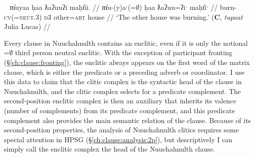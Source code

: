 \ex~ \label{ex:2padjpart}
\begingl
\glpreamble m̓uyaa ḥaa ƛaʔuuʔi maḥt̓ii. //
\gla m̓u-(y)aˑ(=$\emptyset$) ḥaa ƛaʔuu=ʔiˑ maḥt̓iˑ  //
\glb burn-\textsc{cv}(=\textsc{neut.3}) \textsc{d3} other=\textsc{art} house //
\glft `The other house was burning.' (\textbf{C}, \textit{tupaat} Julia Lucas) //
\endgl
\xe


Every clause in Nuuchahnulth contains an enclitic, even if it is only the notional =$\emptyset$ third person neutral enclitic. With the exception of participant fronting (\S\ref{ch:clause:fronting}), the enclitic always appears on the first word of the matrix clause, which is either the predicate or a preceding adverb or coordinator. I use this data to claim that the clitic complex is the syntactic head of the clause in Nuuchahnulth, and the clitic complex selects for a predicate complement. The second-position enclitic complex is then an auxiliary that inherits its valence (number of complements) from its predicate complement, and this predicate complement also provides the main semantic relation of the clause. Because of its second-position properties, the analysis of Nuuchahnulth clitics requires some special attention in HPSG (\S\ref{ch:clause:analysis:2p}), but descriptively I can simply call the enclitic complex the head of the Nuuchahnulth clause.

